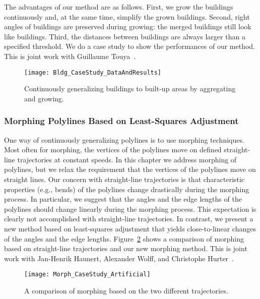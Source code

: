 The advantages of our method are as follows. 
First, we grow the buildings continuously 
and, at the same time, simplify the grown buildings.
Second, right angles of buildings are preserved during growing: 
the merged buildings still look like buildings. 
Third, the distances between buildings are 
always larger than a specified threshold.
We do a case study to show the performances of our method.
This is joint work with 
Guillaume Touya~\parencite[see][]{Peng2017Building}.

\begin{figure}[tb]
\centering
\texttt{[image: Bldg\_CaseStudy\_DataAndResults]}
\caption{Continuously generalizing buildings to built-up 
	areas by aggregating and growing.}
\label{fig:Intro_BldgGrow}
\end{figure}


\subsubsection{Morphing Polylines 
	Based on Least-Squares Adjustment}

One way of continuously generalizing polylines 
is to use morphing techniques. 
Most often for morphing, 
the vertices of the polylines move on 
defined straight-line trajectories at constant speeds.
In this chapter we address morphing of polylines, 
but we relax the requirement that 
the vertices of the polylines move on straight lines. 
Our concern with straight-line trajectories is that 
characteristic properties (e.g., bends) of the polylines 
change drastically during the morphing process. 
In particular, we suggest that 
the angles and the edge lengths of the polylines 
should change linearly during the morphing process. 
This expectation is clearly not accomplished 
with straight-line trajectories. 
In contrast, we present a new method 
based on least-squares adjustment 
that yields close-to-linear changes of 
the angles and the edge lengths. 
Figure~\ref{fig:Intro_LSA_Compare} 
shows a comparison of morphing based on 
straight-line trajectories and our new morphing method.
This is joint work 
with Jan-Henrik Haunert, Alexander Wolff, 
and Christophe Hurter~\parencite[see][]{Peng2013LSA}.

\begin{figure}[htb]
\centering
\texttt{[image: Morph\_CaseStudy\_Artificial]}
\caption{A comparison of morphing 
    based on the two different trajectories.}
\label{fig:Intro_LSA_Compare}
\end{figure}


